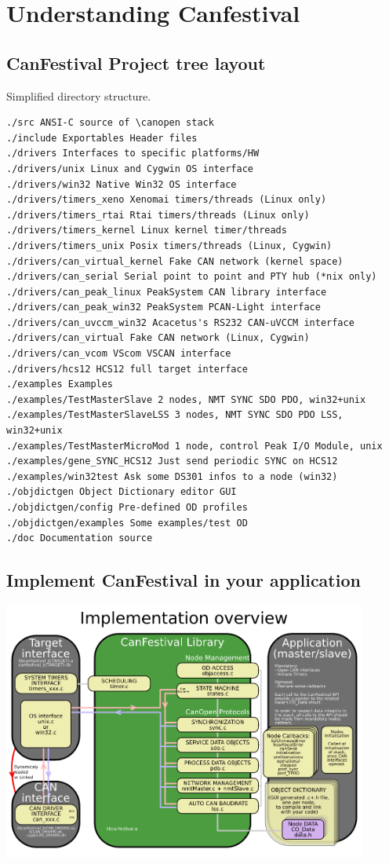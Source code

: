 \documentclass[12pt,english,a4paper]{book}
\newcommand{\canopen}{CANopen }
\begin{document}
\section{Understanding Canfestival}

\subsection{CanFestival Project tree layout}
Simplified directory structure.
\begin{verbatim}
./src ANSI-C source of \canopen stack
./include Exportables Header files
./drivers Interfaces to specific platforms/HW
./drivers/unix Linux and Cygwin OS interface
./drivers/win32 Native Win32 OS interface
./drivers/timers_xeno Xenomai timers/threads (Linux only)
./drivers/timers_rtai Rtai timers/threads (Linux only)
./drivers/timers_kernel Linux kernel timer/threads
./drivers/timers_unix Posix timers/threads (Linux, Cygwin)
./drivers/can_virtual_kernel Fake CAN network (kernel space)
./drivers/can_serial Serial point to point and PTY hub (*nix only)
./drivers/can_peak_linux PeakSystem CAN library interface
./drivers/can_peak_win32 PeakSystem PCAN-Light interface
./drivers/can_uvccm_win32 Acacetus's RS232 CAN-uVCCM interface
./drivers/can_virtual Fake CAN network (Linux, Cygwin)
./drivers/can_vcom VScom VSCAN interface
./drivers/hcs12 HCS12 full target interface
./examples Examples
./examples/TestMasterSlave 2 nodes, NMT SYNC SDO PDO, win32+unix
./examples/TestMasterSlaveLSS 3 nodes, NMT SYNC SDO PDO LSS, win32+unix
./examples/TestMasterMicroMod 1 node, control Peak I/O Module, unix
./examples/gene_SYNC_HCS12 Just send periodic SYNC on HCS12
./examples/win32test Ask some DS301 infos to a node (win32)
./objdictgen Object Dictionary editor GUI
./objdictgen/config Pre-defined OD profiles
./objdictgen/examples Some examples/test OD
./doc Documentation source
\end{verbatim}



\subsection{Implement CanFestival in your application}

\begin{center}
\includegraphics[width=12cm]{Pictures/10000201000003F9000002CF880931E7} 
\par\end{center}
\end{document}
